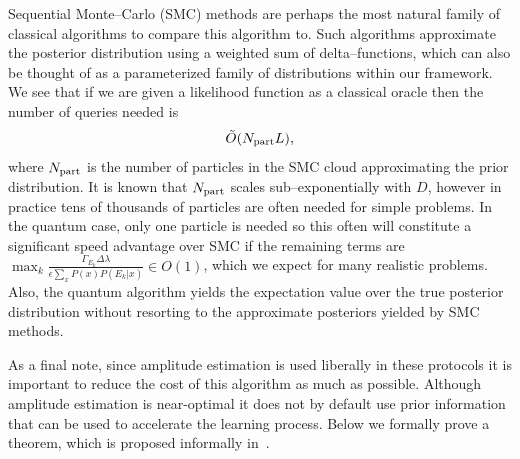 \documentclass[aps,amsmath,onecolumn,amssymb]{revtex4}
\begin{document}
Sequential Monte--Carlo (SMC) methods are perhaps the most natural family of classical algorithms to compare this algorithm to.  Such algorithms approximate the posterior distribution using a weighted sum of delta--functions, which can also be thought of as a parameterized family of distributions within our framework.   We see that if we are given a likelihood function as a classical oracle then the number of queries needed is
\begin{equation}
\tilde{O}(N_{\rm part} L),
\end{equation}
where $N_{\rm part}$ is the number of particles in the SMC cloud approximating the prior distribution.  It is known that $N_{\rm part}$ scales sub--exponentially with $D$, however in practice  tens of thousands of particles are often needed for simple problems.  In the quantum case, only one particle is needed so this often will constitute a significant speed advantage over SMC if the remaining terms are $\max_k \frac{\Gamma_{E_k} \Delta \lambda}{\epsilon \sum_x P(x) P(E_k|x)}\in O(1)$, which we expect for many realistic problems.  Also, the quantum algorithm yields the expectation value over the true posterior distribution without resorting to the approximate posteriors yielded by SMC methods.

As a final note, since amplitude estimation is used liberally in these protocols it is important to reduce the cost of this algorithm as much as possible.  Although amplitude estimation is near-optimal it does not by default use prior information that can be used to accelerate the learning process.  Below we formally prove a theorem, which is proposed informally in~\cite{WHW15}.
\end{document}
